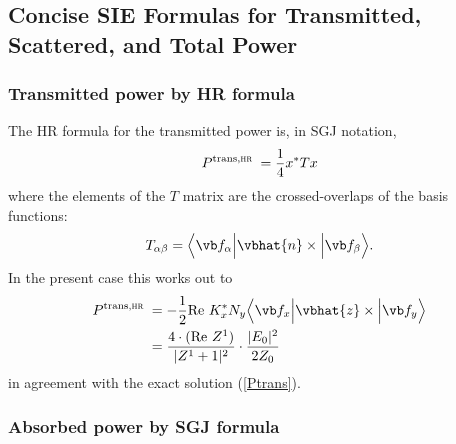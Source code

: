\documentclass{article}
\newcommand{\VMV}[3]{ \Big\langle #1 \Big| #2 \Big| #3 \Big\rangle}
\begin{document}
\subsection{Concise SIE Formulas for Transmitted, Scattered, and Total Power}

\subsubsection{Transmitted power by HR formula}

The HR formula for the transmitted power is, in SGJ notation,
$$ P^{\text{{\scriptsize trans},{\sc hr} }}=\frac{1}{4}x^* T x $$
where the elements of the $T$ matrix are the crossed-overlaps
of the basis functions:
$$ T_{\alpha\beta} = \VMV{\vb f_\alpha}{\vbhat{n}\times}{\vb f_\beta}.$$
In the present case this works out to 
\begin{align*}
 P^{\text{{\scriptsize trans},{\sc hr} }}
& = -\frac{1}{2}\text{Re } K^*_x N_y \VMV{\vb f_x}{\vbhat{z}\times}{\vb f_y}
\\
& = \frac{4\cdot(\text{Re }Z^1)}{|Z^1+1|^2}\cdot \frac{|E_0|^2}{2Z_0}
\end{align*}
in agreement with the exact solution (\ref{Ptrans}).

\subsubsection{Absorbed power by SGJ formula}
\end{document}
